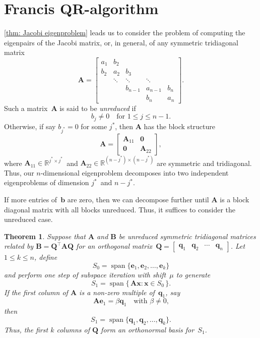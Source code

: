 \documentclass[12pt,a4paper]{article}
\newtheorem{theorem}{Theorem}
\newcommand{\bs}[1]{\boldsymbol{#1}}
\newcommand{\vecspan}{\operatorname{span}}
\begin{document}
\section{Francis QR-algorithm}
\cref{thm: Jacobi eigenproblem} leads us to consider the problem of computing 
the eigenpairs of the Jacobi matrix, or, in general, of any symmetric 
tridiagonal matrix
\[
\bs{A}=\begin{bmatrix}
a_1&b_2   &       &       &\\
b_2&a_2   &b_3    &       &\\
   &\ddots&\ddots &\ddots &\\
   &      &b_{n-1}&a_{n-1}&b_n\\
   &      &       &b_n    &a_n
\end{bmatrix}.
\]
Such a matrix~$\bs{A}$ is said to be \emph{unreduced} if
\[
b_j\ne0\quad\text{for $1\le j\le n-1$.}
\]
Otherwise, if say $b_{j^*}=0$ for some $j^*$, then $\bs{A}$ has the block 
structure
\[
\bs{A}=\left[\begin{array}{c|c}
\bs{A}_{11}&\bs{0}\\
\hline
\bs{0}&\bs{A}_{22}\end{array}\right],
\]
where $\bs{A}_{11}\in\mathbb{R}^{j^*\times j^*}$~and
$\bs{A}_{22}\in\mathbb{R}^{(n-j^*)\times(n-j^*)}$ are symmetric and tridiagonal.
Thus, our $n$-dimensional eigenproblem decomposes into two independent
eigenproblems of dimension $j^*$~and $n-j^*$.

If more entries of~$\bs{b}$ are zero, then we can decompose further until
$\bs{A}$ is a block diagonal matrix with all blocks unreduced.  Thus, it
suffices to consider the unreduced case.

\begin{theorem}\label{thm: implicit Q}
Suppose that $\bs{A}$ and $\bs{B}$ be unreduced
symmetric tridiagonal matrices related by $\bs{B}=\bs{Q}^\top\bs{A}\bs{Q}$ for
an orthogonal
matrix~$\bs{Q}=\begin{bmatrix}\bs{q}_1&\bs{q}_2&\cdots&\bs{q}_n\end{bmatrix}$.
Let $1\le k\le n$, define
\[
S_0=\vecspan\{\bs{e}_1,\bs{e}_2,\ldots,\bs{e}_k\}
\]
and perform one step of subspace iteration with shift~$\mu$ to generate
\[
S_1=\vecspan\{\,\bs{A}\bs{x}:\bs{x}\in S_0\,\}.
\]
If the first column of $\bs{A}$ is a non-zero multiple of~$\bs{q}_1$,
say
\[
\bs{A}\bs{e}_1=\beta\bs{q}_1\quad\text{with $\beta\ne0$,}
\]
then
\[
S_1=\vecspan\{\bs{q}_1,\bs{q}_2,\ldots,\bs{q}_k\}.
\]
Thus, the first $k$ columns of $\bs{Q}$ form an orthonormal basis for~$S_1$.
\end{theorem}
\end{document}
